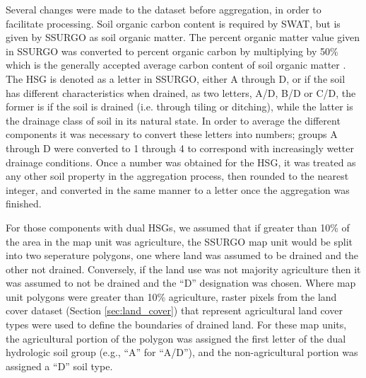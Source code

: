 Several changes were made to the dataset before aggregation, in order to
facilitate processing. Soil organic carbon content is required by SWAT, but is
given by SSURGO as soil organic matter. The percent organic matter value given
in SSURGO was converted to percent organic carbon by multiplying by 50\% which
is the generally accepted average carbon content of soil organic matter
\citep{brady_elements_2004}.
The HSG is denoted as a letter in SSURGO, either A through D, or if the soil has
different characteristics when drained, as two letters, A/D, B/D or C/D, the
former is if the soil is drained (i.e. through tiling or ditching), while the
latter is the drainage class of soil in its natural state.
In order to average the different components it was necessary to convert these
letters into numbers; groups A through D were converted to 1 through 4 to
correspond with increasingly wetter drainage conditions. Once a number was
obtained for the HSG, it was treated as any other soil property in the
aggregation process, then rounded to the nearest integer, and converted in the
same manner to a letter once the aggregation was finished.

For those components with dual HSGs, we assumed that if greater than 10\% of the
area in the map unit was agriculture, the SSURGO map unit would be split into
two seperature polygons, one where land was assumed to be drained and the other
not drained. Conversely, if the land use was not majority agriculture then it
was assumed to not be drained and the ``D'' designation was chosen. Where map
unit polygons were greater than 10\% agriculture, raster pixels from the land
cover dataset (Section \ref{sec:land_cover}) that represent agricultural land
cover types were used to define the boundaries of drained land. For these map
units, the agricultural portion of the polygon was assigned the first letter of
the dual hydrologic soil group (e.g., ``A'' for ``A/D''), and the
non-agricultural portion was assigned a ``D'' soil type.


